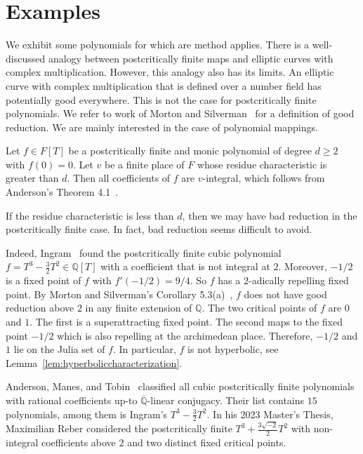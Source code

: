 \documentclass[12pt,oneside,a4]{amsart}
\newcommand{\IQ}{\mathbb{Q}}
\newcommand{\IQbar}{\overline{\mathbb{Q}}}
\numberwithin{maincounter}{section}
\numberwithin{equation}{section}
\begin{document}


\section{Examples}
\label{sec:examples}

We exhibit some polynomials for which are method applies.
There is a well-discussed analogy between postcritically finite maps
and elliptic curves with complex multiplication. However, this analogy
also has its limits. An
elliptic curve with complex multiplication that is defined over a
number field has potentially good everywhere. This is not  the case
for postcritically finite polynomials. We refer to work of Morton and
Silverman~\cite{MortonSilverman} for a definition of good reduction.
We are mainly interested in the case of polynomial mappings. 

Let $f\in F[T]$ be a postcritically finite and  monic polynomial of degree
$d\ge 2$ with $f(0)=0$. Let $v$ be a finite place of $F$ whose residue
characteristic is greater than $d$. Then all coefficients of $f$ are
$v$-integral, which follows from Anderson's Theorem 4.1~\cite{Anderson:radius}.

If the residue characteristic is less than $d$, then we may have
bad reduction in the postcritically finite case. In fact, bad
reduction seems difficult to avoid.

Indeed, 
Ingram~\cite{Ingram:PCF} found the postcritically finite cubic
polynomial $f= T^3-\frac 32 T^2\in\IQ[T]$
with a coefficient that is not integral at $2$.
Moreover, $-1/2$ is a fixed point of $f$ with $f'(-1/2)=9/4$. So
$f$ has a 
 $2$-adically repelling fixed point. By Morton and Silverman's Corollary
5.3(a)~\cite{MortonSilverman},
$f$ does not have good reduction above $2$ in any
finite extension of $\IQ$.
The two critical points of $f$ are $0$ and $1$. The first is a
superattracting fixed point. The second maps to the fixed point $-1/2$ which is 
also repelling at the archimedean place.
Therefore,  $-1/2$ and $1$ lie on the Julia set of $f$. 
In particular, $f$ is not hyperbolic, see
Lemma~\ref{lem:hyperboliccharacterization}. 

Anderson, Manes, and Tobin~\cite{AndersonManesTobin} classified
all cubic postcritically finite polynomials with rational coefficients
up-to $\IQbar$-linear conjugacy. Their list contains $15$ polynomials,
among them is Ingram's $T^3-\frac 32 T^2$.
In his 2023 Master's Thesis, Maximilian Reber considered
the postcritically finite $ T^3 + \frac{3\sqrt{-2}}{2} T^2$ with non-integral
coefficients above $2$ and two distinct fixed critical points. 
\end{document}
